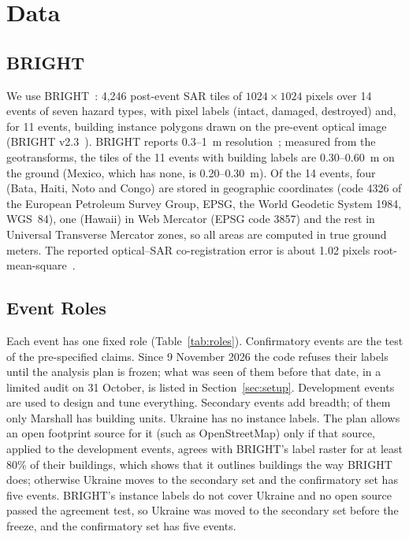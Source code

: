 \documentclass[journal]{IEEEtran}
\begin{document}
\section{Data}
\label{sec:data}

\subsection{BRIGHT}
We use BRIGHT~\cite{chen2025bright}: 4,246 post-event SAR tiles of $1024\times1024$ pixels over 14 events of seven hazard types, with pixel labels (intact, damaged, destroyed) and, for 11 events, building instance polygons drawn on the pre-event optical image (BRIGHT v2.3~\cite{chen2026brightzenodo}). BRIGHT reports 0.3--1~m resolution~\cite{chen2025bright}; measured from the geotransforms, the tiles of the 11 events with building labels are 0.30--0.60~m on the ground (Mexico, which has none, is 0.20--0.30~m). Of the 14 events, four (Bata, Haiti, Noto and Congo) are stored in geographic coordinates (code 4326 of the European Petroleum Survey Group, EPSG, the World Geodetic System 1984, WGS~84), one (Hawaii) in Web Mercator (EPSG code 3857) and the rest in Universal Transverse Mercator zones, so all areas are computed in true ground meters. The reported optical--SAR co-registration error is about 1.02 pixels root-mean-square~\cite{chen2025bright}.

\subsection{Event Roles}
Each event has one fixed role (Table~\ref{tab:roles}). Confirmatory events are the test of the pre-specified claims. Since 9 November 2026 the code refuses their labels until the analysis plan is frozen; what was seen of them before that date, in a limited audit on 31 October, is listed in Section~\ref{sec:setup}. Development events are used to design and tune everything. Secondary events add breadth; of them only Marshall has building units. Ukraine has no instance labels. The plan allows an open footprint source for it (such as OpenStreetMap) only if that source, applied to the development events, agrees with BRIGHT's label raster for at least 80\% of their buildings, which shows that it outlines buildings the way BRIGHT does; otherwise Ukraine moves to the secondary set and the confirmatory set has five events. BRIGHT's instance labels do not cover Ukraine and no open source passed the agreement test, so Ukraine was moved to the secondary set before the freeze, and the confirmatory set has five events.
\end{document}
